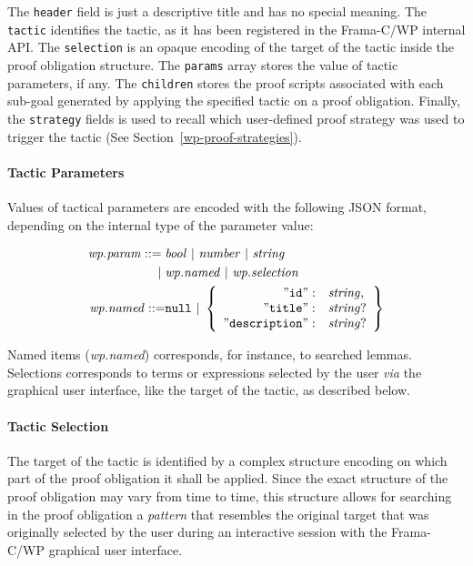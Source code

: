 The \verb"header" field is just a descriptive title and has no special
meaning. The \verb"tactic" identifies the tactic, as it has been registered in
the \textsf{Frama-C/WP} internal API.  The \verb"selection" is an opaque
encoding of the target of the tactic inside the proof obligation structure. The
\verb"params" array stores the value of tactic parameters, if any.  The
\verb"children" stores the proof scripts associated with each sub-goal generated
by applying the specified tactic on a proof obligation. Finally, the
\verb"strategy" fields is used to recall which user-defined proof strategy was
used to trigger the tactic (See Section~\ref{wp-proof-strategies}).

\paragraph{Tactic Parameters} Values of tactical parameters are encoded with the
following \textsf{JSON} format, depending on the internal type of the parameter
value:

\begin{align*}
    \mathit{wp.param} ::=\;&
    \mathit{bool} ~|~ \mathit{number} ~|~ \mathit{string} \\
    |\;&\mathit{wp.named} ~|~ \mathit{wp.selection} \\
    \mathit{wp.named} ::= &\mathtt{null} ~|~
    \left\{
    \begin{array}{rl}
        \mathtt{"id"} :& \mathit{string}, \\
        \mathtt{"title"} :& \mathit{string}? \\
        \mathtt{"description"} :& \mathit{string}?
    \end{array}
    \right\}
\end{align*}

Named items (\textit{wp.named}) corresponds, for instance, to searched lemmas.
Selections corresponds to terms or expressions selected by the user \emph{via}
the graphical user interface, like the target of the tactic, as described below.

\paragraph{Tactic Selection} The target of the tactic
is identified by a complex structure
encoding on which part of the proof obligation it shall be applied. Since the
exact structure of the proof obligation may vary from time to time, this structure
allows for searching in the proof obligation a \emph{pattern} that resembles the
original target that was originally selected by the user during an interactive
session with the \textsf{Frama-C/WP} graphical user interface.

